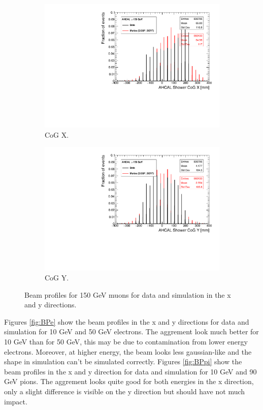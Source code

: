 \begin{figure}[htbp!]
  \centering
  \begin{subfigure}[t]{0.49\textwidth}
    \includegraphics[width=1.\linewidth]{chap5/fig_AHCAL_Timing/Muons/BeamProfileX.pdf}
    \caption{CoG X.} \label{fig:mu150GeVX}
  \end{subfigure}
  \hfill
  \begin{subfigure}[t]{0.49\textwidth}
    \includegraphics[width=1.\linewidth]{chap5/fig_AHCAL_Timing/Muons/BeamProfileY.pdf}
    \caption{CoG Y.} \label{fig:mu150GeVY}
  \end{subfigure}
  \caption{Beam profiles for 150 GeV muons for data and simulation in the x and y directions.}
  \label{fig:BPmu}
\end{figure}

Figures \ref{fig:BPe} show the beam profiles in the x and y directions for data and simulation for 10 GeV and 50 GeV electrons. The aggrement look much better for 10 GeV than for 50 GeV, this may be due to contamination from lower energy electrons. Moreover, at higher energy, the beam looks less gaussian-like and the shape in simulation can't be simulated correctly. Figures \ref{fig:BPpi} show the beam profiles in the x and y direction for data and simulation for 10 GeV and 90 GeV pions. The aggrement looks quite good for both energies in the x direction, only a slight difference is visible on the y direction but should have not much impact.

